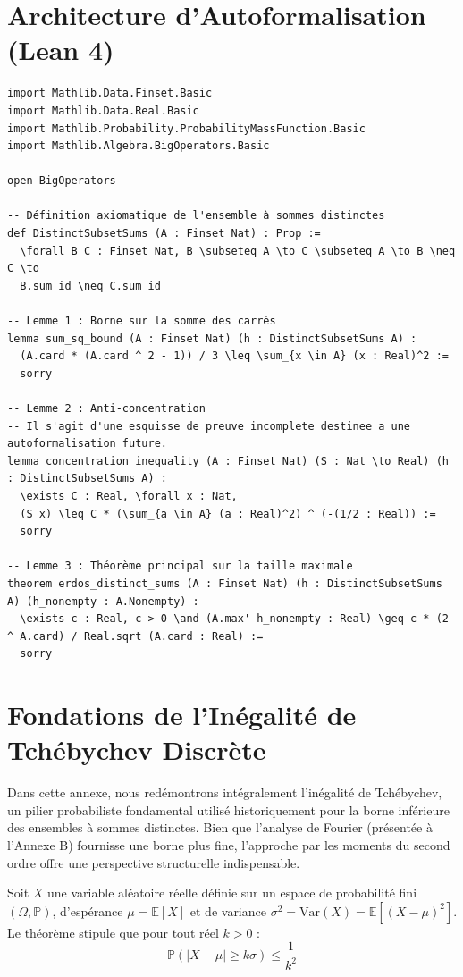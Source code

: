 \documentclass[12pt,a4paper]{article}
\begin{document}
\section{Architecture d'Autoformalisation (Lean 4)}

\begin{verbatim}
import Mathlib.Data.Finset.Basic
import Mathlib.Data.Real.Basic
import Mathlib.Probability.ProbabilityMassFunction.Basic
import Mathlib.Algebra.BigOperators.Basic

open BigOperators

-- Définition axiomatique de l'ensemble à sommes distinctes
def DistinctSubsetSums (A : Finset Nat) : Prop :=
  \forall B C : Finset Nat, B \subseteq A \to C \subseteq A \to B \neq C \to
  B.sum id \neq C.sum id

-- Lemme 1 : Borne sur la somme des carrés
lemma sum_sq_bound (A : Finset Nat) (h : DistinctSubsetSums A) :
  (A.card * (A.card ^ 2 - 1)) / 3 \leq \sum_{x \in A} (x : Real)^2 :=
  sorry

-- Lemme 2 : Anti-concentration
-- Il s'agit d'une esquisse de preuve incomplete destinee a une autoformalisation future.
lemma concentration_inequality (A : Finset Nat) (S : Nat \to Real) (h : DistinctSubsetSums A) :
  \exists C : Real, \forall x : Nat,
  (S x) \leq C * (\sum_{a \in A} (a : Real)^2) ^ (-(1/2 : Real)) :=
  sorry

-- Lemme 3 : Théorème principal sur la taille maximale
theorem erdos_distinct_sums (A : Finset Nat) (h : DistinctSubsetSums A) (h_nonempty : A.Nonempty) :
  \exists c : Real, c > 0 \and (A.max' h_nonempty : Real) \geq c * (2 ^ A.card) / Real.sqrt (A.card : Real) :=
  sorry
\end{verbatim}

\newpage
\appendix
\section{Fondations de l'Inégalité de Tchébychev Discrète}

Dans cette annexe, nous redémontrons intégralement l'inégalité de Tchébychev, un pilier probabiliste fondamental utilisé historiquement pour la borne inférieure des ensembles à sommes distinctes. Bien que l'analyse de Fourier (présentée à l'Annexe B) fournisse une borne plus fine, l'approche par les moments du second ordre offre une perspective structurelle indispensable.

Soit $X$ une variable aléatoire réelle définie sur un espace de probabilité fini $(\Omega, \mathbb{P})$, d'espérance $\mu = \mathbb{E}[X]$ et de variance $\sigma^2 = \text{Var}(X) = \mathbb{E}[(X - \mu)^2]$.
Le théorème stipule que pour tout réel $k > 0$ :
$$ \mathbb{P}(|X - \mu| \ge k\sigma) \le \frac{1}{k^2} $$
\end{document}
